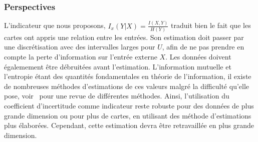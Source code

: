 \subsubsection{Perspectives}

L'indicateur que nous proposons, $I_x(Y|X) = \frac{I(X,Y)}{H(Y)}$ traduit bien le fait que les cartes ont appris une relation entre les entrées. Son estimation doit passer par une discrétisation avec des intervalles larges pour $U$, afin de ne pas prendre en compte la perte d'information sur l'entrée externe $X$.
Les données doivent égalemement être débruitées avant l'estimation.
L'information mutuelle et l'entropie étant des quantités fondamentales en théorie de l'information, il existe de nombreuses méthodes d'estimations de ces valeurs malgré la difficulté qu'elle pose, voir~\cite{Doquire2012ACO} pour une revue de différentes méthodes. Ainsi, l'utilisation du coefficient d'incertitude comme indicateur reste robuste pour des données de plus grande dimension ou pour plus de cartes, en utilisant des méthode d'estimations plus élaborées. Cependant, cette estimation devra être retravaillée en plus grande dimension. 





